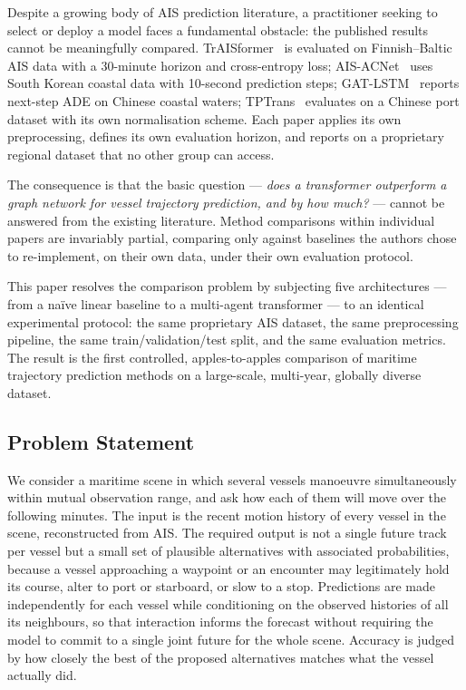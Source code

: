 \documentclass[12pt, a4paper]{article}
\begin{document}
  Despite a growing body of AIS prediction literature, a practitioner seeking to select
  or deploy a model faces a fundamental obstacle: the published results cannot be
  meaningfully compared.  TrAISformer~\citep{nguyen2021traisformer} is evaluated on
  Finnish--Baltic AIS data with a 30-minute horizon and cross-entropy loss;
  AIS-ACNet~\citep{shin2024aisacnet} uses South Korean coastal data with 10-second
  prediction steps; GAT-LSTM~\citep{zhao2023gatlstm} reports next-step ADE on
  Chinese coastal waters; TPTrans~\citep{wang2024tptrans} evaluates on a Chinese
  port dataset with its own normalisation scheme.  Each paper applies its own
  preprocessing, defines its own evaluation horizon, and reports on a proprietary
  regional dataset that no other group can access.

  The consequence is that the basic question --- \textit{does a transformer outperform a
  graph network for vessel trajectory prediction, and by how much?} --- cannot be answered
  from the existing literature.  Method comparisons within individual papers are invariably
  partial, comparing only against baselines the authors chose to re-implement, on their
  own data, under their own evaluation protocol.

  This paper resolves the comparison problem by subjecting five architectures --- from a
  na\"{i}ve linear baseline to a multi-agent transformer --- to an identical experimental
  protocol: the same proprietary AIS dataset, the same preprocessing pipeline, the same
  train/validation/test split, and the same evaluation metrics.  The result is the first
  controlled, apples-to-apples comparison of maritime trajectory prediction methods on
  a large-scale, multi-year, globally diverse dataset.

  \subsection{Problem Statement}

  We consider a maritime scene in which several vessels manoeuvre simultaneously
  within mutual observation range, and ask how each of them will move over the
  following minutes.  The input is the recent motion history of every vessel in
  the scene, reconstructed from AIS.  The required output is not a single future
  track per vessel but a small set of plausible alternatives with associated
  probabilities, because a vessel approaching a waypoint or an encounter may
  legitimately hold its course, alter to port or starboard, or slow to a stop.
  Predictions are made independently for each vessel while conditioning on the
  observed histories of all its neighbours, so that interaction informs the
  forecast without requiring the model to commit to a single joint future for
  the whole scene.  Accuracy is judged by how closely the best of the proposed
  alternatives matches what the vessel actually did.
\end{document}
